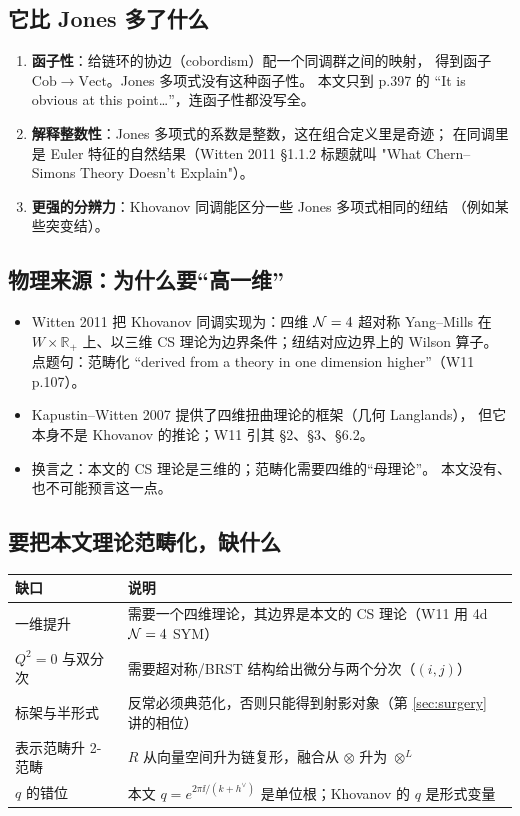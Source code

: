 \subsection{它比 Jones 多了什么}
\begin{enumerate}[leftmargin=*]
  \item \textbf{函子性}：给链环的协边（cobordism）配一个同调群之间的映射，
        得到函子 $\mathrm{Cob}\to\mathrm{Vect}$。Jones 多项式没有这种函子性。
        本文只到 p.397 的 “It is obvious at this point…”，连函子性都没写全。
  \item \textbf{解释整数性}：Jones 多项式的系数是整数，这在组合定义里是奇迹；
        在同调里是 Euler 特征的自然结果（Witten 2011 \S1.1.2 标题就叫
        "What Chern--Simons Theory Doesn't Explain"）。
  \item \textbf{更强的分辨力}：Khovanov 同调能区分一些 Jones 多项式相同的纽结
        （例如某些突变结）。
\end{enumerate}

\subsection{物理来源：为什么要“高一维”}
\begin{itemize}
  \item Witten 2011 把 Khovanov 同调实现为：四维 $\mathcal{N}=4$ 超对称 Yang--Mills 在
        $W\times\mathbb R_+$ 上、以三维 CS 理论为边界条件；纽结对应边界上的 Wilson 算子。
        点题句：范畴化 “derived from a theory in one dimension higher”（W11 p.107）。
  \item Kapustin--Witten 2007 提供了四维扭曲理论的框架（几何 Langlands），
        但它本身不是 Khovanov 的推论；W11 引其 \S2、\S3、\S6.2。
  \item 换言之：本文的 CS 理论是三维的；范畴化需要四维的“母理论”。
        本文没有、也不可能预言这一点。
\end{itemize}

\subsection{要把本文理论范畴化，缺什么}
\begin{center}
\begin{tabular}{@{}p{3.2cm}p{8.8cm}@{}}
\toprule
缺口 & 说明 \\
\midrule
一维提升 & 需要一个四维理论，其边界是本文的 CS 理论（W11 用 4d $\mathcal{N}=4$ SYM） \\
$Q^2=0$ 与双分次 & 需要超对称/BRST 结构给出微分与两个分次（$(i,j)$） \\
标架与半形式 & 反常必须典范化，否则只能得到射影对象（第 \ref{sec:surgery} 讲的相位） \\
表示范畴升 2-范畴 & $R$ 从向量空间升为链复形，融合从 $\otimes$ 升为 $\otimes^L$ \\
$q$ 的错位 & 本文 $q=e^{2\pi\ii/(k+h^\vee)}$ 是单位根；Khovanov 的 $q$ 是形式变量 \\
\bottomrule
\end{tabular}
\end{center}

